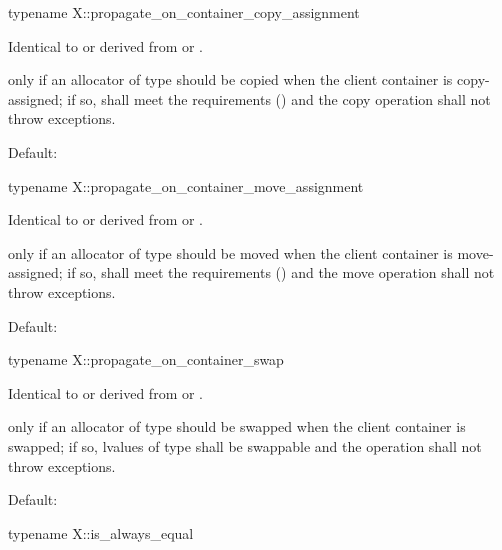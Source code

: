 \begin{itemdecl}
typename X::propagate_on_container_copy_assignment
\end{itemdecl}

\begin{itemdescr}
\pnum
\result
Identical to or derived from  or .

\pnum
\returns
{} only if an allocator of type  should be copied
when the client container is copy-assigned;
if so,  shall meet
the  requirements () and
the copy operation shall not throw exceptions.

\pnum
\remarks
Default: 
\end{itemdescr}

\begin{itemdecl}
typename X::propagate_on_container_move_assignment
\end{itemdecl}

\begin{itemdescr}
\pnum
\result
Identical to or derived from  or .

\pnum
\returns
{} only if an allocator of type  should be moved
when the client container is move-assigned;
if so,  shall meet
the  requirements () and
the move operation shall not throw exceptions.

\pnum
\remarks
Default: 
\end{itemdescr}

\begin{itemdecl}
typename X::propagate_on_container_swap
\end{itemdecl}

\begin{itemdescr}
\pnum
\result
Identical to or derived from  or .

\pnum
\returns
{} only if an allocator of type  should be swapped
when the client container is swapped;
if so,
lvalues of type  shall be swappable and
the  operation shall not throw exceptions.

\pnum
\remarks
Default: 
\end{itemdescr}

\begin{itemdecl}
typename X::is_always_equal
\end{itemdecl}

